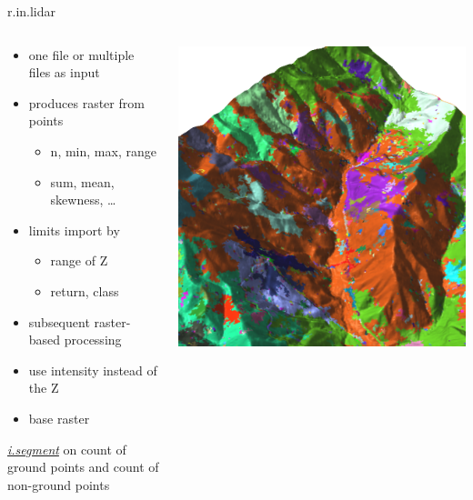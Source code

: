 \documentclass[xcolor={dvipsnames,usenames},beamer,aspectratio=169]{beamer}
\newcommand{\gmodule}[1]{\href{http://grass.osgeo.org/grass71/manuals/#1.html}{\emph{#1}}}
\begin{document}
\begin{frame}{r.in.lidar}

\begin{columns}
\begin{column}{0.4\textwidth}


\begin{itemize}
  \item one file or multiple files as input
  \item produces raster from points
  \begin{itemize}
    \item n, min, max, range
    \item sum, mean, skewness, \ldots
  \end{itemize}
  \item limits import by
  \begin{itemize}
    \item range of Z
    \item return, class
  \end{itemize}
  \item subsequent raster-based processing
  \item use intensity instead of the Z
  \item base raster
\end{itemize}

\begin{flushright}
\footnotesize
\gmodule{i.segment} on count of ground points and count of non-ground points
\end{flushright}

\end{column}
\begin{column}{0.45\textwidth}

\begin{center}
  \includegraphics[width=\textwidth]{grass/segment_on_counts}
\end{center}


\end{column}
\end{columns}
\end{frame}
\end{document}
